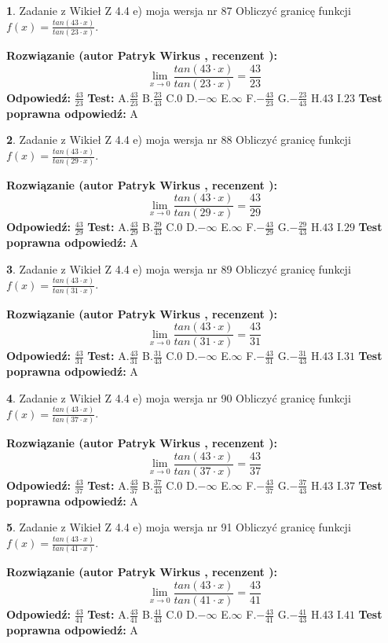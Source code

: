 \documentclass[12pt, a4paper]{article}
\theoremstyle{definition} %
\newtheorem{zad}{}
\newcommand{\zadStart}[1]{\begin{zad}#1\newline}
\newcommand{\zadStop}{\end{zad}}
\newcommand{\rozwStart}[2]{\noindent \textbf{Rozwiązanie (autor #1 , recenzent #2): }\newline}
\newcommand{\rozwStop}{\newline}
\newcommand{\odpStart}{\noindent \textbf{Odpowiedź:}\newline}
\newcommand{\odpStop}{\newline}
\newcommand{\testStart}{\noindent \textbf{Test:}\newline}
\newcommand{\testStop}{\newline}
\newcommand{\kluczStart}{\noindent \textbf{Test poprawna odpowiedź:}\newline}
\newcommand{\kluczStop}{\newline}
\begin{document}
\zadStart{Zadanie z Wikieł Z 4.4 e) moja wersja nr 87}
Obliczyć granicę funkcji $f(x)=\frac{tan(43\cdot x)}{tan(23\cdot x)}$.
\zadStop
\rozwStart{Patryk Wirkus}{}
$$\lim\limits_{x\to 0}\frac{tan(43\cdot x)}{tan(23\cdot x)}=
\frac{43}{23}$$
\rozwStop
\odpStart
$\frac{43}{23}$
\odpStop
\testStart
A.$\frac{43}{23}$
B.$\frac{23}{43}$
C.$0$
D.$-\infty$
E.$\infty$
F.$-\frac{43}{23}$
G.$-\frac{23}{43}$
H.$43$
I.$23$
\testStop
\kluczStart
A
\kluczStop



\zadStart{Zadanie z Wikieł Z 4.4 e) moja wersja nr 88}
Obliczyć granicę funkcji $f(x)=\frac{tan(43\cdot x)}{tan(29\cdot x)}$.
\zadStop
\rozwStart{Patryk Wirkus}{}
$$\lim\limits_{x\to 0}\frac{tan(43\cdot x)}{tan(29\cdot x)}=
\frac{43}{29}$$
\rozwStop
\odpStart
$\frac{43}{29}$
\odpStop
\testStart
A.$\frac{43}{29}$
B.$\frac{29}{43}$
C.$0$
D.$-\infty$
E.$\infty$
F.$-\frac{43}{29}$
G.$-\frac{29}{43}$
H.$43$
I.$29$
\testStop
\kluczStart
A
\kluczStop



\zadStart{Zadanie z Wikieł Z 4.4 e) moja wersja nr 89}
Obliczyć granicę funkcji $f(x)=\frac{tan(43\cdot x)}{tan(31\cdot x)}$.
\zadStop
\rozwStart{Patryk Wirkus}{}
$$\lim\limits_{x\to 0}\frac{tan(43\cdot x)}{tan(31\cdot x)}=
\frac{43}{31}$$
\rozwStop
\odpStart
$\frac{43}{31}$
\odpStop
\testStart
A.$\frac{43}{31}$
B.$\frac{31}{43}$
C.$0$
D.$-\infty$
E.$\infty$
F.$-\frac{43}{31}$
G.$-\frac{31}{43}$
H.$43$
I.$31$
\testStop
\kluczStart
A
\kluczStop



\zadStart{Zadanie z Wikieł Z 4.4 e) moja wersja nr 90}
Obliczyć granicę funkcji $f(x)=\frac{tan(43\cdot x)}{tan(37\cdot x)}$.
\zadStop
\rozwStart{Patryk Wirkus}{}
$$\lim\limits_{x\to 0}\frac{tan(43\cdot x)}{tan(37\cdot x)}=
\frac{43}{37}$$
\rozwStop
\odpStart
$\frac{43}{37}$
\odpStop
\testStart
A.$\frac{43}{37}$
B.$\frac{37}{43}$
C.$0$
D.$-\infty$
E.$\infty$
F.$-\frac{43}{37}$
G.$-\frac{37}{43}$
H.$43$
I.$37$
\testStop
\kluczStart
A
\kluczStop



\zadStart{Zadanie z Wikieł Z 4.4 e) moja wersja nr 91}
Obliczyć granicę funkcji $f(x)=\frac{tan(43\cdot x)}{tan(41\cdot x)}$.
\zadStop
\rozwStart{Patryk Wirkus}{}
$$\lim\limits_{x\to 0}\frac{tan(43\cdot x)}{tan(41\cdot x)}=
\frac{43}{41}$$
\rozwStop
\odpStart
$\frac{43}{41}$
\odpStop
\testStart
A.$\frac{43}{41}$
B.$\frac{41}{43}$
C.$0$
D.$-\infty$
E.$\infty$
F.$-\frac{43}{41}$
G.$-\frac{41}{43}$
H.$43$
I.$41$
\testStop
\kluczStart
A
\kluczStop
\end{document}
